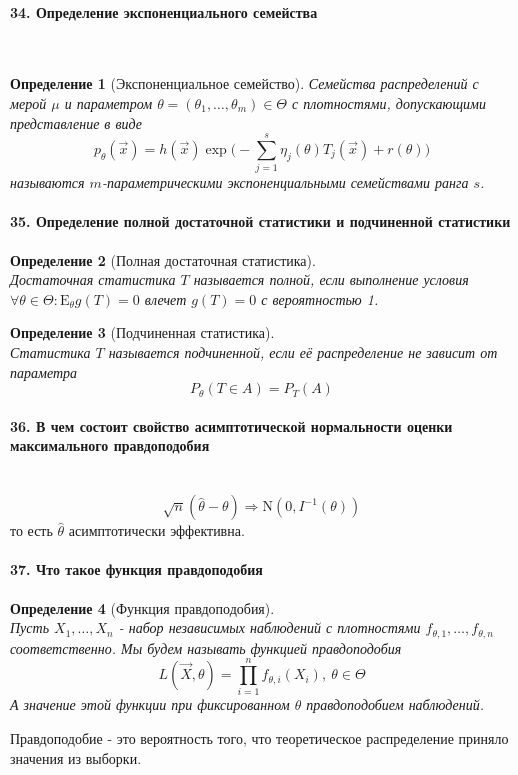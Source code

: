 \documentclass[titlepage]{article}
\newcommand{\sE}{\mathrm{E}}
\newcommand{\sN}{\mathrm{N}} %
\newtheorem{definition}{Определение}
\begin{document}
\paragraph{34. Определение экспоненциального семейства} ~\\
\begin{definition}[Экспоненциальное семейство]
	Семейства распределений с мерой $\mu$ и параметром $\theta = (\theta_1,\dots,\theta_m) \in \Theta$ с плотностями, допускающими представление в виде
	\[p_\theta(\vec x) = h(\vec x)\exp\bigg(-\sum_{j=1}^s\eta_j(\theta)T_j(\vec x)+r(\theta)\bigg)\]
	называются $m$-параметрическими экспоненциальными семействами ранга $s$.
\end{definition}

\paragraph{35. Определение полной достаточной статистики и подчиненной статистики}
\begin{definition}[Полная достаточная статистика] ~\\
	Достаточная статистика $T$ называется полной, если выполнение условия $\forall \theta \in \Theta: \sE_\theta g(T) = 0$ влечет $g(T) = 0$  с вероятностью 1.
\end{definition}
\begin{definition}[Подчиненная статистика] ~\\
	Статистика $T$ называется подчиненной, если её распределение не зависит от параметра
	$$P_\theta (T\in A) = P_T(A)$$
\end{definition}

\paragraph{36. В чем состоит свойство асимптотической нормальности оценки максимального правдоподобия} ~\\
\[\sqrt{n}(\hat\theta-\theta)\Rightarrow\sN(0,I^{-1}(\theta))\]
то есть $\hat\theta$ асимптотически эффективна.

\paragraph{37. Что такое функция правдоподобия}
\begin{definition}[Функция правдоподобия] ~\\
	Пусть $X_1,\dots,X_n$ - набор независимых наблюдений с плотностями $f_{\theta,1},\dots,f_{\theta,n}$ соответственно. Мы будем называть функцией правдоподобия
	\[L(\vec X, \theta) = \prod_{i=1}^nf_{\theta,i}(X_i),\ \theta \in \Theta\]
	А значение этой функции при фиксированном $\theta$ правдоподобием наблюдений.
\end{definition}
Правдоподобие - это вероятность того, что теоретическое распределение приняло значения из выборки.
\end{document}
